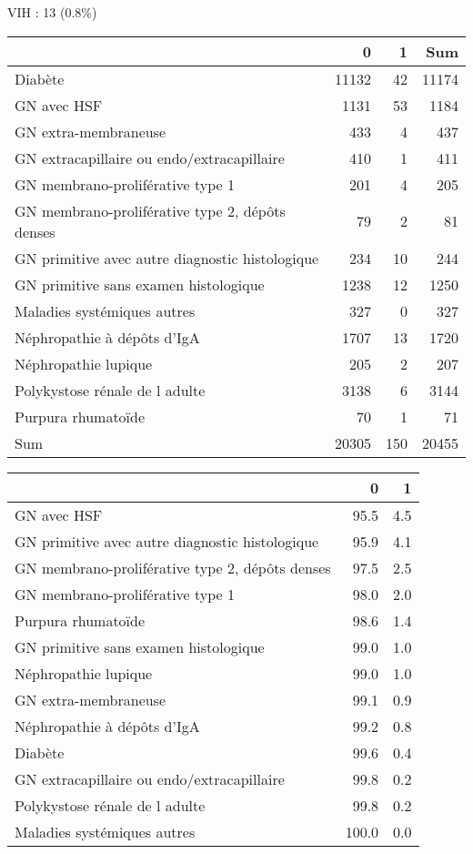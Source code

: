 \documentclass[11pt,a4paper]{article}\usepackage[]{graphicx}\usepackage[]{color}
\begin{document}
VIH : 13 (0.8\%)
\begin{table}[H]
\centering
\begin{tabular}{lrrr}
  \hline
 & 0 & 1 & Sum \\ 
  \hline
Diabète & 11132 & 42 & 11174 \\ 
  GN avec HSF & 1131 & 53 & 1184 \\ 
  GN extra-membraneuse & 433 & 4 & 437 \\ 
  GN extracapillaire ou endo/extracapillaire & 410 & 1 & 411 \\ 
  GN membrano-proliférative type 1 & 201 & 4 & 205 \\ 
  GN membrano-proliférative type 2, dépôts denses & 79 & 2 & 81 \\ 
  GN primitive avec autre diagnostic histologique & 234 & 10 & 244 \\ 
  GN primitive sans examen histologique & 1238 & 12 & 1250 \\ 
  Maladies systémiques autres & 327 & 0 & 327 \\ 
  Néphropathie à dépôts d'IgA & 1707 & 13 & 1720 \\ 
  Néphropathie lupique & 205 & 2 & 207 \\ 
  Polykystose rénale de l adulte & 3138 & 6 & 3144 \\ 
  Purpura rhumatoïde & 70 & 1 & 71 \\ 
  Sum & 20305 & 150 & 20455 \\ 
   \hline
\end{tabular}
\end{table}
\begin{table}[H]
\centering
\begin{tabular}{lrr}
  \hline
 & 0 & 1 \\ 
  \hline
GN avec HSF & 95.5 & 4.5 \\ 
  GN primitive avec autre diagnostic histologique & 95.9 & 4.1 \\ 
  GN membrano-proliférative type 2, dépôts denses & 97.5 & 2.5 \\ 
  GN membrano-proliférative type 1 & 98.0 & 2.0 \\ 
  Purpura rhumatoïde & 98.6 & 1.4 \\ 
  GN primitive sans examen histologique & 99.0 & 1.0 \\ 
  Néphropathie lupique & 99.0 & 1.0 \\ 
  GN extra-membraneuse & 99.1 & 0.9 \\ 
  Néphropathie à dépôts d'IgA & 99.2 & 0.8 \\ 
  Diabète & 99.6 & 0.4 \\ 
  GN extracapillaire ou endo/extracapillaire & 99.8 & 0.2 \\ 
  Polykystose rénale de l adulte & 99.8 & 0.2 \\ 
  Maladies systémiques autres & 100.0 & 0.0 \\ 
   \hline
\end{tabular}
\end{table}
\end{document}
